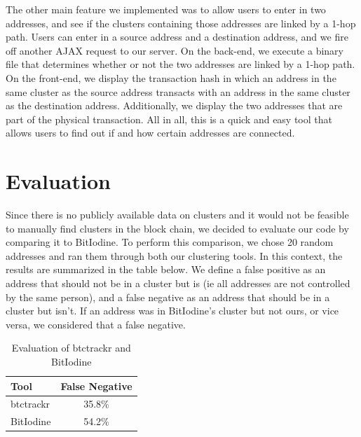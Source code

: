 \documentclass[10pt, letterpaper, twocolumn, twoside]{article}
\begin{document}
The other main feature we implemented was to allow users to enter in two addresses, and see if the clusters containing those addresses are linked by a 1-hop path. Users can enter in a source address and a destination address, and we fire off another AJAX request to our server. On the back-end, we execute a binary file that determines whether or not the two addresses are linked by a 1-hop path. On the front-end, we display the transaction hash in which an address in the same cluster as the source address transacts with an address in the same cluster as the destination address. Additionally, we display the two addresses that are part of the physical transaction. All in all, this is a quick and easy tool that allows users to find out if and how certain addresses are connected.

\section{Evaluation}

Since there is no publicly available data on clusters and it would not be feasible to manually find clusters in the block chain, we decided to evaluate our code by comparing it to BitIodine. To perform this comparison, we chose 20 random addresses and ran them through both our clustering tools. In this context, the results are summarized in the table below. We define a false positive as an address that should not be in a cluster but is (ie all addresses are not controlled by the same person), and a false negative as an address that should be in a cluster but isn't. If an address was in BitIodine's cluster but not ours, or vice versa, we considered that a false negative.

\begin{table}[h]
\caption{Evaluation of btctrackr and BitIodine}
\centering
\begin{tabular}{lc}
\hline
Tool & False Negative \\
\hline\hline
btctrackr & 35.8\% \\
BitIodine & 54.2\% \\
\end{tabular}
\end{table}
\end{document}
